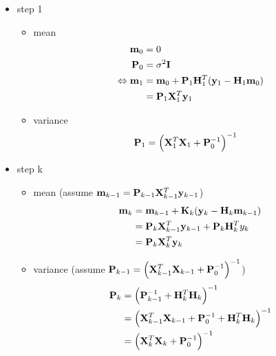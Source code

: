 \documentclass[a4paper,oneside,article]{memoir}
\begin{document}
\begin{itemize}
  \item step 1
  \begin{itemize}
  	\item mean
\begin{align}
	\mathbf{m}_{0}&=0\\
	\mathbf{P}_0&=\sigma^2\mathbf{I}\\
	\Leftrightarrow \mathbf{m}_{1}&=\mathbf{m}_{0}+\mathbf{P}_1\mathbf{H}_1^T(\mathbf{y}_{1}-\mathbf{H}_1\mathbf{m}_{0})\\
	&=\mathbf{P}_1\mathbf{X}_1^T\mathbf{y}_{1}
\end{align}
  	\item variance 
\begin{align}
	\mathbf{P}_{1}&= \left(\mathbf{X}_1^T\mathbf{X}_1+\mathbf{P}_{0}^{-1}\right)^{-1}
\end{align}
  \end{itemize}
  \item step k
  \begin{itemize}
  	\item mean (assume $\mathbf{m}_{k-1}= \mathbf{P}_{k-1}\mathbf{X}_{k-1}^T\mathbf{y}_{k-1}$)
\begin{align}
	\mathbf{m}_{k}&=\mathbf{m}_{k-1} + \mathbf{K}_k(\mathbf{y}_{k}-\mathbf{H}_k\mathbf{m}_{k-1})\\
	&=\mathbf{P}_k\mathbf{X}_{k-1}^T\mathbf{y}_{k-1}+\mathbf{P}_k\mathbf{H}_k^Ty_k\\
	&=\mathbf{P}_k\mathbf{X}_{k}^T\mathbf{y}_{k}
\end{align}
  	\item variance (assume $\mathbf{P}_{k-1}= \left(\mathbf{X}_{k-1}^T\mathbf{X}_{k-1}+\mathbf{P}_{0}^{-1}\right)^{-1}$)
\begin{align}
	\mathbf{P}_{k}&= \left( \mathbf{P}_{k-1}^{-1} +\mathbf{H}_k^T\mathbf{H}_k \right)^{-1}\\
	&=\left( \mathbf{X}_{k-1}^T\mathbf{X}_{k-1}+\mathbf{P}_{0}^{-1}+\mathbf{H}_k^T\mathbf{H}_k \right)^{-1}\\
	&=\left( \mathbf{X}_{k}^T\mathbf{X}_{k}+\mathbf{P}_{0}^{-1} \right)^{-1}	
\end{align}
  \end{itemize}
\end{itemize}

\subsection{}

\subsubsection{}
\end{document}
